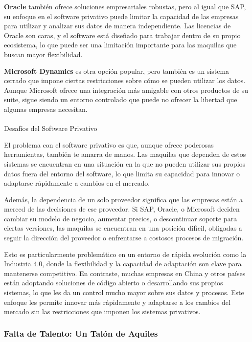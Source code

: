 \documentclass[
  letterpaper,
]{book}
\makeatletter
\let\oldparagraph\paragraph
\renewcommand{\paragraph}{
    \@ifstar
      \xxxParagraphStar
      \xxxParagraphNoStar
  }
\newcommand{\xxxParagraphStar}[1]{\oldparagraph*{#1}\mbox{}}
\newcommand{\xxxParagraphNoStar}[1]{\oldparagraph{#1}\mbox{}}
\makeatother
\begin{document}
\textbf{Oracle} también ofrece soluciones empresariales robustas, pero
al igual que SAP, su enfoque en el software privativo puede limitar la
capacidad de las empresas para utilizar y analizar sus datos de manera
independiente. Las licencias de Oracle son caras, y el software está
diseñado para trabajar dentro de su propio ecosistema, lo que puede ser
una limitación importante para las maquilas que buscan mayor
flexibilidad.

\textbf{Microsoft Dynamics} es otra opción popular, pero también es un
sistema cerrado que impone ciertas restricciones sobre cómo se pueden
utilizar los datos. Aunque Microsoft ofrece una integración más amigable
con otros productos de su suite, sigue siendo un entorno controlado que
puede no ofrecer la libertad que algunas empresas necesitan.

\paragraph{Desafíos del Software
Privativo}\label{desafuxedos-del-software-privativo}

El problema con el software privativo es que, aunque ofrece poderosas
herramientas, también te amarra de manos. Las maquilas que dependen de
estos sistemas se encuentran en una situación en la que no pueden
utilizar sus propios datos fuera del entorno del software, lo que limita
su capacidad para innovar o adaptarse rápidamente a cambios en el
mercado.

Además, la dependencia de un solo proveedor significa que las empresas
están a merced de las decisiones de ese proveedor. Si SAP, Oracle, o
Microsoft deciden cambiar su modelo de negocio, aumentar precios, o
descontinuar soporte para ciertas versiones, las maquilas se encuentran
en una posición difícil, obligadas a seguir la dirección del proveedor o
enfrentarse a costosos procesos de migración.

Esto es particularmente problemático en un entorno de rápida evolución
como la Industria 4.0, donde la flexibilidad y la capacidad de
adaptación son clave para mantenerse competitivo. En contraste, muchas
empresas en China y otros países están adoptando soluciones de código
abierto o desarrollando sus propios sistemas, lo que les da un control
mucho mayor sobre sus datos y procesos. Este enfoque les permite innovar
más rápidamente y adaptarse a los cambios del mercado sin las
restricciones que imponen los sistemas privativos.

\subsubsection{Falta de Talento: Un Talón de
Aquiles}\label{falta-de-talento-un-taluxf3n-de-aquiles}
\end{document}
